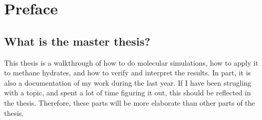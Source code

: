 \chapter*{Preface}
\section{What is the master thesis?}
This thesis is a walkthrough of how to do molecular simulations, how to apply it to methane hydrates, and how to verify and interpret the results. In part, it is also a documentation of my work during the last year. If I have been strugling with a topic, and spent a lot of time figuring it out, this should be reflected in the thesis. Therefore, these parts will be more elaborate than other parts of the thesis.
